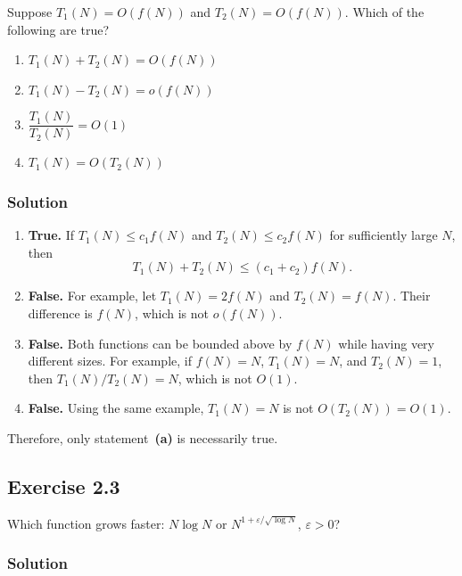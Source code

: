 \documentclass[12pt,a4paper]{article}
\begin{document}
\noindent
Suppose $T_1(N)=O(f(N))$ and $T_2(N)=O(f(N))$. Which of the following
are true?

\begin{enumerate}
  \renewcommand{\labelenumi}{\alph{enumi}.}
  \item $T_1(N)+T_2(N)=O(f(N))$
  \item $T_1(N)-T_2(N)=o(f(N))$
  \item $\dfrac{T_1(N)}{T_2(N)}=O(1)$
  \item $T_1(N)=O(T_2(N))$
\end{enumerate}

\subsubsection*{\color{sectionnavy}Solution}

\begin{enumerate}
  \renewcommand{\labelenumi}{\alph{enumi}.}

  \item \textbf{True.}
  If $T_1(N)\leq c_1f(N)$ and $T_2(N)\leq c_2f(N)$ for sufficiently
  large $N$, then
  \[
    T_1(N)+T_2(N)\leq (c_1+c_2)f(N).
  \]

  \item \textbf{False.}
  For example, let $T_1(N)=2f(N)$ and $T_2(N)=f(N)$. Their difference
  is $f(N)$, which is not $o(f(N))$.

  \item \textbf{False.}
  Both functions can be bounded above by $f(N)$ while having very
  different sizes. For example, if $f(N)=N$, $T_1(N)=N$, and
  $T_2(N)=1$, then $T_1(N)/T_2(N)=N$, which is not $O(1)$.

  \item \textbf{False.}
  Using the same example, $T_1(N)=N$ is not $O(T_2(N))=O(1)$.
\end{enumerate}

Therefore, only statement~\textbf{(a)} is necessarily true.

\subsection*{\color{sectionnavy}Exercise 2.3}

\noindent
Which function grows faster: $N\log N$ or
$N^{1+\varepsilon/\sqrt{\log N}}$, $\varepsilon>0$?

\subsubsection*{\color{sectionnavy}Solution}
\end{document}
